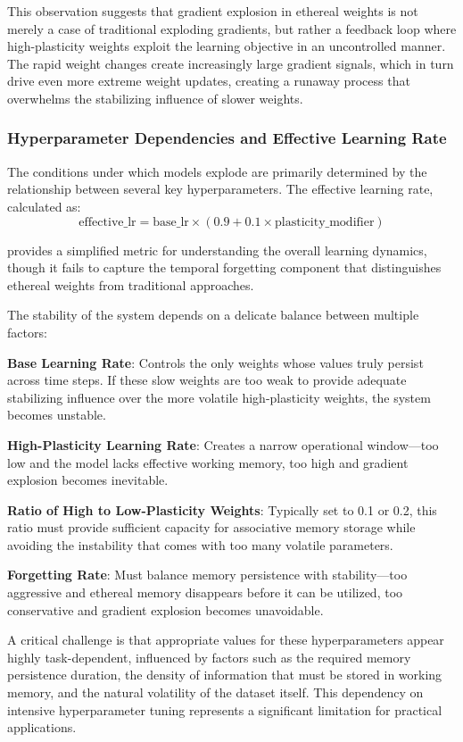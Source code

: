 \documentclass{article} %
\begin{document}
This observation suggests that gradient explosion in ethereal weights is not merely a case of traditional exploding gradients, but rather a feedback loop where high-plasticity weights exploit the learning objective in an uncontrolled manner. The rapid weight changes create increasingly large gradient signals, which in turn drive even more extreme weight updates, creating a runaway process that overwhelms the stabilizing influence of slower weights.

\subsubsection{Hyperparameter Dependencies and Effective Learning Rate}

The conditions under which models explode are primarily determined by the relationship between several key hyperparameters. The effective learning rate, calculated as:
\begin{equation}
\text{effective\_lr} = \text{base\_lr} \times (0.9 + 0.1 \times \text{plasticity\_modifier})
\end{equation}

provides a simplified metric for understanding the overall learning dynamics, though it fails to capture the temporal forgetting component that distinguishes ethereal weights from traditional approaches.

The stability of the system depends on a delicate balance between multiple factors:

\textbf{Base Learning Rate}: Controls the only weights whose values truly persist across time steps. If these slow weights are too weak to provide adequate stabilizing influence over the more volatile high-plasticity weights, the system becomes unstable.

\textbf{High-Plasticity Learning Rate}: Creates a narrow operational window—too low and the model lacks effective working memory, too high and gradient explosion becomes inevitable.

\textbf{Ratio of High to Low-Plasticity Weights}: Typically set to 0.1 or 0.2, this ratio must provide sufficient capacity for associative memory storage while avoiding the instability that comes with too many volatile parameters.

\textbf{Forgetting Rate}: Must balance memory persistence with stability—too aggressive and ethereal memory disappears before it can be utilized, too conservative and gradient explosion becomes unavoidable.

A critical challenge is that appropriate values for these hyperparameters appear highly task-dependent, influenced by factors such as the required memory persistence duration, the density of information that must be stored in working memory, and the natural volatility of the dataset itself. This dependency on intensive hyperparameter tuning represents a significant limitation for practical applications.
\end{document}
